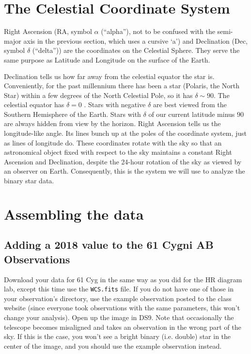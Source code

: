 \section{The Celestial Coordinate System}

Right Ascension (RA, symbol $\alpha$ (``alpha''), not to be confused with the semi-major axis in the previous section, which uses a cursive `a') and Declination (Dec, symbol $\delta$ (``delta'')) are the coordinates on the Celestial Sphere.  They serve the same purpose as Latitude and Longitude on the surface of the Earth.  

Declination tells us how far away from the celestial equator the star is.  Conveniently, for the past millennium there has been a star (Polaris, the North Star) within a few degrees of the North Celestial Pole, so it has $\delta \sim 90$\textdegree.  The celestial equator has $\delta = 0$\textdegree%
. Stars with negative $\delta$ are best viewed from the Southern Hemisphere of the Earth.  Stars with $\delta$ of our current latitude minus $90$\textdegree are always hidden from view by the horizon. Right Ascension tells us the longitude-like angle.  Its lines bunch up at the poles of the coordinate system, just as lines of longitude do. These coordinates rotate with the sky so that an astronomical object fixed with respect to the sky maintains a constant Right Ascension and Declination, despite the 24-hour rotation of the sky as viewed by an observer on Earth. Consequently, this is the system we will use to analyze the binary star data.

\section{Assembling the data}
\subsection{Adding a 2018 value to the 61 Cygni AB Observations}

Download your data for 61 Cyg in the same way as you did for the HR diagram lab, except this time use the \texttt{WCS.fits} file. If you do not have one of those in your observation's directory, use the example observation posted to the class website (since everyone took observations with the same parameters, this won't change your analysis). Open up the image in DS9. Note that occasionally the telescope becomes misaligned and takes an observation in the wrong part of the sky. If this is the case, you won't see a bright binary (i.e. double) star in the center of the image, and you should use the example observation instead.

